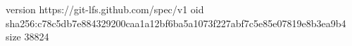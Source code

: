version https://git-lfs.github.com/spec/v1
oid sha256:c78c5db7e884329200caa1a12bf6ba5a1073f227abf7c5e85e07819e8b3ea9b4
size 38824
